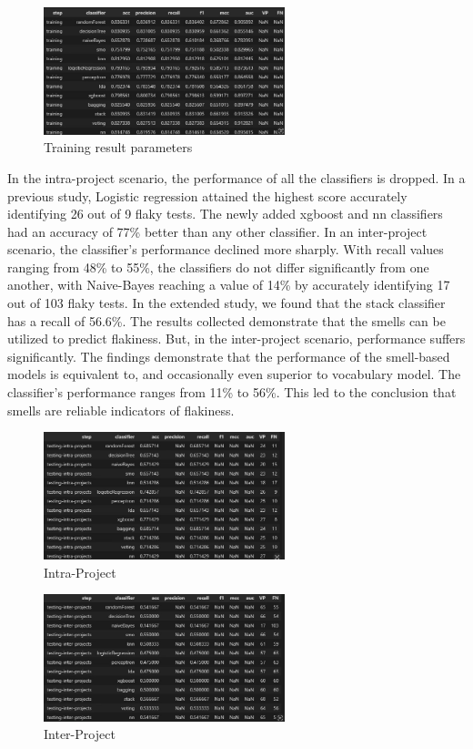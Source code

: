 \documentclass[sigconf,review]{acmart}
\begin{document}
\begin{figure}
    \centering
    \includegraphics[width=7cm]{TrainingTestSmell.png}
    \caption{Training result parameters}
    \label{fig:my_label}
\end{figure}

In the intra-project scenario, the performance of all the classifiers is dropped. In a previous study, Logistic regression attained the highest score accurately identifying 26 out of 9 flaky tests. The newly added xgboost and nn classifiers had an accuracy of 77\% better than any other classifier.  In an inter-project scenario, the classifier’s performance declined more sharply. With recall values ranging from 48\% to 55\%, the classifiers do not differ significantly from one another, with Naive-Bayes reaching a value of 14\% by accurately identifying 17 out of 103 flaky tests. In the extended study, we found that the stack classifier has a recall of 56.6\%.
The results collected demonstrate that the smells can be utilized to predict flakiness. But, in the inter-project scenario, performance suffers significantly. The findings demonstrate that the performance of the smell-based models is equivalent to, and occasionally even superior to vocabulary model. The classifier’s performance ranges from 11\% to 56\%.
This led to the conclusion that smells are reliable indicators of flakiness.
\\
\begin{figure}
    \centering
    \includegraphics[width=7cm]{IntraProjects.png}
    \caption{Intra-Project}
    \label{fig:my_label}
\end{figure}

\begin{figure}
    \centering
    \includegraphics[width=7cm]{InterProjects.png}
    \caption{Inter-Project}
    \label{fig:my_label}
\end{figure}
\end{document}
